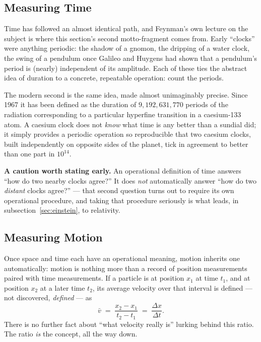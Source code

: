\subsection{Measuring Time}
\label{sec:time}

Time has followed an almost identical path, and Feynman's own lecture on the subject is where this section's second motto-fragment comes from. Early ``clocks'' were anything periodic: the shadow of a gnomon, the dripping of a water clock, the swing of a pendulum once Galileo and Huygens had shown that a pendulum's period is (nearly) independent of its amplitude. Each of these ties the abstract idea of duration to a concrete, repeatable operation: count the periods.

The modern second is the same idea, made almost unimaginably precise. Since 1967 it has been defined as the duration of \(9{,}192{,}631{,}770\) periods of the radiation corresponding to a particular hyperfine transition in a caesium-133 atom. A caesium clock does not \emph{know} what time is any better than a sundial did; it simply provides a periodic operation so reproducible that two caesium clocks, built independently on opposite sides of the planet, tick in agreement to better than one part in \(10^{14}\).

\begin{mdframed}[backgroundcolor=gray!8, linecolor=gray!40, linewidth=0.6pt, roundcorner=3pt]
\textbf{A caution worth stating early.} An operational definition of time answers ``how do two nearby clocks agree?'' It does \emph{not} automatically answer ``how do two \emph{distant} clocks agree?'' --- that second question turns out to require its own operational procedure, and taking that procedure seriously is what leads, in subsection~\ref{sec:einstein}, to relativity.
\end{mdframed}

\subsection{Measuring Motion}
\label{sec:motion}

Once space and time each have an operational meaning, motion inherits one automatically: motion is nothing more than a record of position measurements paired with time measurements. If a particle is at position $x_1$ at time $t_1$, and at position $x_2$ at a later time $t_2$, its average velocity over that interval is defined --- not discovered, \emph{defined} --- as
\[
  \bar v \;=\; \frac{x_2 - x_1}{t_2 - t_1} \;=\; \frac{\Delta x}{\Delta t}.
\]
There is no further fact about ``what velocity really is'' lurking behind this ratio. The ratio \emph{is} the concept, all the way down.

